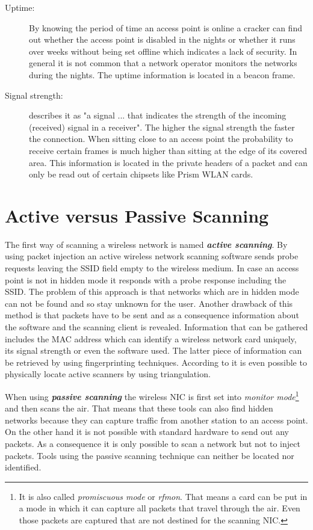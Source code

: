 \begin{description}
	\item[Uptime:]
		By knowing the period of time an access point is online a cracker can find out 
		whether the access point is disabled in the nights or whether it 
		runs over weeks without being set offline which indicates a lack of 
		security. In general it is not common that a network operator 
		monitors the networks during the nights. The uptime information is located in a beacon frame.
	\item[Signal strength:]
		\cite{signal_strength} describes it as "a signal ... that indicates the strength of the incoming (received) signal in a receiver". The higher the signal strength the faster the connection. 
		When sitting close to an access point the probability to receive 
		certain frames is much higher than sitting at the edge of its covered area. This 
		information is located in the private headers of a packet and can only be read out of certain chipsets like Prism WLAN cards.
\end{description}

\section{Active versus Passive Scanning}
\label{sec:active_passive_scanning}

The first way of scanning a wireless network is named {\bf {\em active scanning}}. By using packet injection an active wireless network scanning software sends probe requests leaving the SSID field empty to the wireless medium. In case an access point is not in hidden mode it responds with a probe response including the SSID. The problem of this approach is that networks which are in hidden mode can not be found and so stay unknown for the user. Another drawback of this method is that packets have to be sent and as a consequence information about the software and the scanning client is revealed. Information that can be gathered includes the MAC address which can identify a wireless network card uniquely, its signal strength or even the software used. The latter piece of information can be retrieved by using fingerprinting techniques. According to \cite{triangulation} it is even possible to physically locate active scanners by using triangulation.

When using {\bf {\em passive scanning}} the wireless NIC is first set into {\em monitor mode}\footnote{It is also called {\em promiscuous mode} or {\em rfmon}. That means a card can be put in a mode in which it can capture all packets that travel through the air. Even those packets are captured that are not destined for the scanning NIC.} and then scans the air. That means that these tools can also find hidden networks because they can capture traffic from another station to an access point. On the other hand it is not possible with standard hardware to send out any packets. As a consequence it is only possible to scan a network but not to inject packets. Tools using the passive scanning technique can neither be located nor identified.

